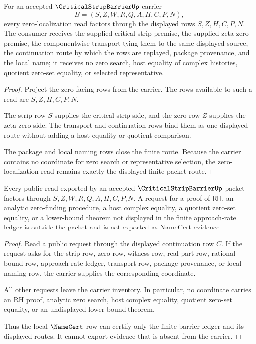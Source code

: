 \begin{theorem}
\label{thm:critical-strip-barrier-zero-localization-route}
For an accepted $\CriticalStripBarrierUp$ carrier
$$
B=(S,Z,W,R,Q,A,H,C,P,N),
$$
every zero-localization read factors through the displayed rows $S,Z,H,C,P,N$. The consumer receives the supplied critical-strip premise, the supplied zeta-zero premise, the componentwise transport tying them to the same displayed source, the continuation route by which the rows are replayed, package provenance, and the local name; it receives no zero search, host equality of complex histories, quotient zero-set equality, or selected representative.
\end{theorem}
\begin{proof}
Project the zero-facing rows from the carrier. The rows available to such a read are $S,Z,H,C,P,N$.

The strip row $S$ supplies the critical-strip side, and the zero row $Z$ supplies the zeta-zero side. The transport and continuation rows bind them as one displayed route without adding a host equality or quotient comparison.

The package and local naming rows close the finite route. Because the carrier contains no coordinate for zero search or representative selection, the zero-localization read remains exactly the displayed finite packet route.
\end{proof}

\begin{theorem}
\label{thm:critical-strip-barrier-nonescape}
Every public read exported by an accepted $\CriticalStripBarrierUp$ packet factors through $S,Z,W,R,Q,A,H,C,P,N$. A request for a proof of $\mathsf{RH}$, an analytic zero-finding procedure, a host complex equality, a quotient zero-set equality, or a lower-bound theorem not displayed in the finite approach-rate ledger is outside the packet and is not exported as NameCert evidence.
\end{theorem}
\begin{proof}
Read a public request through the displayed continuation row $C$. If the request asks for the strip row, zero row, witness row, real-part row, rational-bound row, approach-rate ledger, transport row, package provenance, or local naming row, the carrier supplies the corresponding coordinate.

All other requests leave the carrier inventory. In particular, no coordinate carries an RH proof, analytic zero search, host complex equality, quotient zero-set equality, or an undisplayed lower-bound theorem.

Thus the local $\NameCert$ row can certify only the finite barrier ledger and its displayed routes. It cannot export evidence that is absent from the carrier.
\end{proof}

